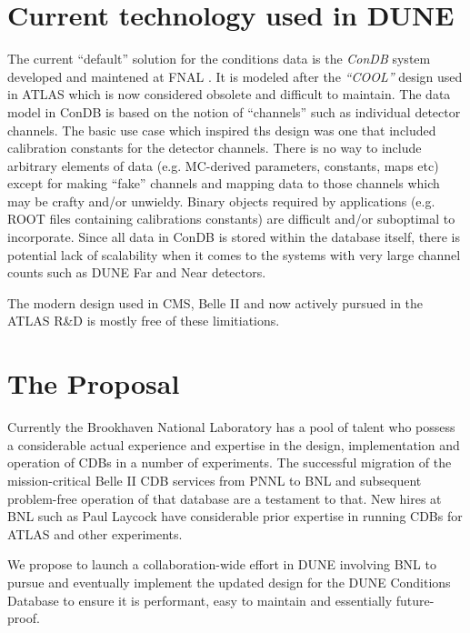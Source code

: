\documentclass[pdftex,12pt,letter]{article}
\begin{document}
\section{Current technology used in DUNE}

The current ``default'' solution for the conditions data is the \textit{ConDB} system developed and maintened
at FNAL \cite{condb}. It is modeled after the \textit{``COOL''} design used in ATLAS which is now considered obsolete and
difficult to maintain. The data model in ConDB is based on the notion of ``channels'' such as individual detector
channels. The basic use case which inspired ths design was one that included calibration constants for the detector channels.
There is no way to include arbitrary elements of data (e.g. MC-derived parameters, constants, maps etc) except for
making ``fake'' channels and mapping data to those channels which may be crafty and/or unwieldy. Binary objects
required by applications (e.g. ROOT files containing calibrations constants) are difficult and/or suboptimal
to incorporate. Since all data in ConDB is stored within the database itself, there is potential lack of scalability
when it comes to the systems with very large channel counts such as DUNE Far and Near detectors.

The modern design used in CMS, Belle II and now actively pursued in the ATLAS R\&D is mostly free of these limitiations.

\section{The Proposal}

Currently the  Brookhaven National Laboratory has a pool of talent who possess a considerable actual experience
and expertise in the design, implementation and operation of CDBs in a number of experiments. The successful
migration of the mission-critical Belle II CDB services from PNNL to BNL and subsequent problem-free operation of that
database are a testament to that. New hires at BNL such as Paul Laycock have considerable prior expertise in running
CDBs for ATLAS and other experiments.

We propose to launch a collaboration-wide effort in DUNE involving BNL to pursue and eventually implement the updated
design for the DUNE Conditions Database to ensure it is performant, easy to maintain and essentially future-proof.



\end{document}
